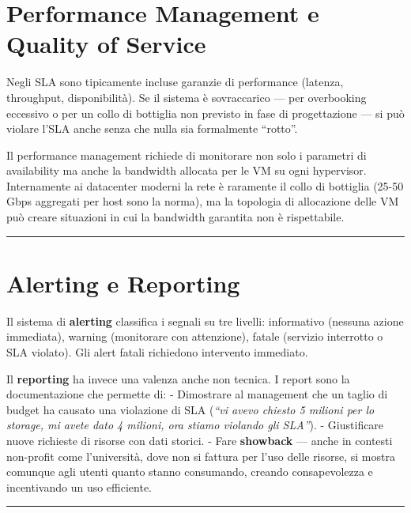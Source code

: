 \documentclass[
  italian,
  openany]{book}
\begin{document}
\section{Performance Management e Quality of
Service}\label{performance-management-e-quality-of-service}

Negli SLA sono tipicamente incluse garanzie di performance (latenza,
throughput, disponibilità). Se il sistema è sovraccarico --- per
overbooking eccessivo o per un collo di bottiglia non previsto in fase
di progettazione --- si può violare l'SLA anche senza che nulla sia
formalmente ``rotto''.

Il performance management richiede di monitorare non solo i parametri di
availability ma anche la bandwidth allocata per le VM su ogni
hypervisor. Internamente ai datacenter moderni la rete è raramente il
collo di bottiglia (25-50 Gbps aggregati per host sono la norma), ma la
topologia di allocazione delle VM può creare situazioni in cui la
bandwidth garantita non è rispettabile.

\begin{center}\rule{0.5\linewidth}{0.5pt}\end{center}

\section{Alerting e Reporting}\label{alerting-e-reporting}

Il sistema di \textbf{alerting} classifica i segnali su tre livelli:
informativo (nessuna azione immediata), warning (monitorare con
attenzione), fatale (servizio interrotto o SLA violato). Gli alert
fatali richiedono intervento immediato.

Il \textbf{reporting} ha invece una valenza anche non tecnica. I report
sono la documentazione che permette di: - Dimostrare al management che
un taglio di budget ha causato una violazione di SLA (\emph{``vi avevo
chiesto 5 milioni per lo storage, mi avete dato 4 milioni, ora stiamo
violando gli SLA''}). - Giustificare nuove richieste di risorse con dati
storici. - Fare \textbf{showback} --- anche in contesti non-profit come
l'università, dove non si fattura per l'uso delle risorse, si mostra
comunque agli utenti quanto stanno consumando, creando consapevolezza e
incentivando un uso efficiente.

\begin{center}\rule{0.5\linewidth}{0.5pt}\end{center}
\end{document}
